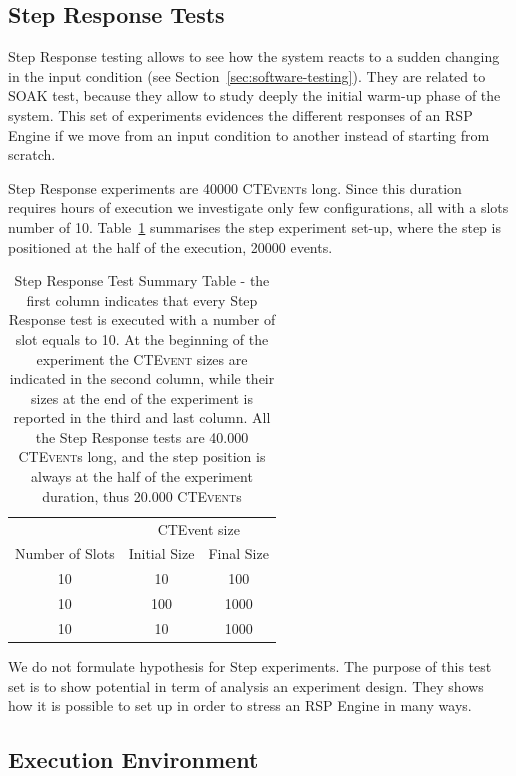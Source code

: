 \subsection{Step Response Tests}\label{sec:step-es}

Step Response testing allows to see how the system reacts to a sudden changing in the input condition (see Section~\ref{sec:software-testing}). They are related to SOAK test, because they allow to study deeply the initial warm-up phase of the system. This set of experiments evidences the different responses of an RSP Engine if we move from an input condition to another instead of starting from scratch.

Step Response experiments are 40000 \textsc{CTEvent}s long. Since this duration requires hours of execution we investigate only few configurations, all with a slots number of 10. Table~\ref{tab:steptests} summarises the step experiment set-up, where the step is positioned at the half of the execution, 20000 events.
\begin{table}[htb]
\centering
 \begin{tabular}{c|c|c}
	  	\hline
	  	&\multicolumn{2}{c}{CTEvent size}  \\
		Number of Slots & Initial Size & Final Size\\
		\hline
		\hline
		 10 & 10 & 100\\
		 10 & 100 & 1000\\
		 10 & 10 & 1000\\
		\hline 
 \end{tabular}
 \caption[Step Response Tests Summary Table]{Step Response Test Summary Table -  the first column indicates that every Step Response test is executed with a number of slot equals to 10. At the beginning of the experiment the \textsc{CTEvent} sizes are indicated in the second column, while their sizes at the end of the experiment is reported in the third and last column. All the Step Response tests are 40.000 \textsc{CTEvent}s long, and the step position is always at the half of the experiment duration, thus 20.000 \textsc{CTEvent}s}
\label{tab:steptests}
\end{table}

We do not formulate hypothesis for Step experiments. The purpose of this test set is to show \name potential in term of analysis an experiment design. They shows how it is possible to set up \name in order to stress an RSP Engine in many ways.

\subsection{Execution Environment}\label{sec:execution-environment}

